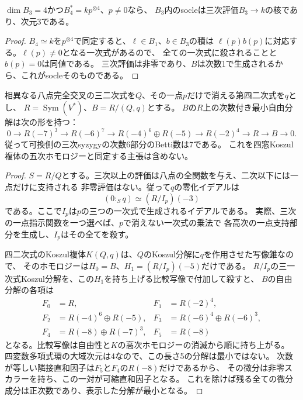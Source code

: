 \begin{lemma}[一点基点の場合の低次socle]\label{lem:one-basepoint-cubic-socle}
$\dim B_3=4$かつ$B_4^*=k p^{\otimes4}$、$p\ne0$なら、
$B_3$内のsocleは三次評価$B_3\to k$の核であり、次元3である。
\end{lemma}
\begin{proof}
$B_4\simeq k$を$p^{\otimes4}$で同定すると、$\ell\in B_1$、$b\in B_3$の積は
$\ell(p)b(p)$に対応する。$\ell(p)\ne0$となる一次式があるので、
全ての一次式に殺されることと$b(p)=0$は同値である。
三次評価は非零であり、$B$は次数1で生成されるから、これがsocleそのものである。
\end{proof}

\begin{proposition}[縮約一点境界の可換最小自由分解]
\label{prop:reduced-onepoint-commutative-betti}
相異なる八点完全交叉の三二次式を$Q$、その一点$p$だけで消える第四二次式を$q$とし、
$R=\operatorname{Sym}(V^*)$、$B=R/(Q,q)$とする。
$B$の$R$上の次数付き最小自由分解は次の形を持つ：
\[
0\longrightarrow R(-7)^3\longrightarrow R(-6)^7
\longrightarrow R(-4)^6\oplus R(-5)
\longrightarrow R(-2)^4\longrightarrow R\longrightarrow B\longrightarrow0.
\]
従って可換側の三次syzygyの次数6部分のBetti数は7である。
これを四窓Koszul複体の五次ホモロジーと同定する主張は含めない。
\end{proposition}
\begin{proof}
$S=R/Q$とする。三次以上の評価は八点の全関数を与え、二次以下には一点だけに支持される
非零評価はない。従って$q$の零化イデアルは
\[
 (0:_S q)\simeq (R/I_p)(-3)
\]
である。ここで$I_p$は$p$の三つの一次式で生成されるイデアルである。
実際、三次の一点指示関数を一つ選べば、$p$で消えない一次式の乗法で
各高次の一点支持部分を生成し、$I_p$はその全てを殺す。

四二次式のKoszul複体$K(Q,q)$は、$Q$のKoszul分解に$q$を作用させた写像錐なので、
そのホモロジーは$H_0=B$、$H_1=(R/I_p)(-5)$だけである。
$R/I_p$の三一次式Koszul分解を、この$H_1$を持ち上げる比較写像で付加して殺すと、
$B$の自由分解の各項は
\[
\begin{aligned}
 F_0&=R,&F_1&=R(-2)^4,\\
 F_2&=R(-4)^6\oplus R(-5),&F_3&=R(-6)^4\oplus R(-6)^3,\\
 F_4&=R(-8)\oplus R(-7)^3,&F_5&=R(-8)
\end{aligned}
\]
となる。比較写像は自由性と$K$の高次ホモロジーの消滅から順に持ち上がる。
四変数多項式環の大域次元は4なので、この長さ5の分解は最小ではない。
次数が等しい隣接直和因子は$F_5$と$F_4$の$R(-8)$だけであるから、
その微分は非零スカラーを持ち、この一対が可縮直和因子となる。
これを除けば残る全ての微分成分は正次数であり、表示した分解が最小となる。
\end{proof}

